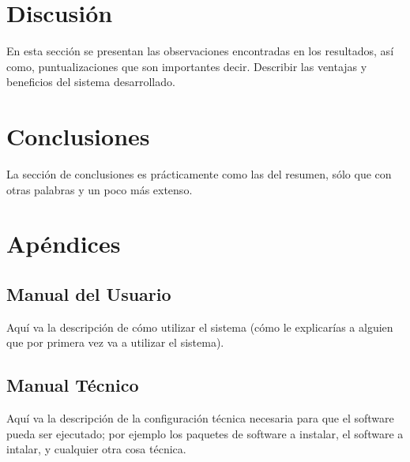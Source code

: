 \documentclass[letterpaper, 11pt]{article}
\begin{document}
%
\section{Discusión}
\label{disc}
En esta sección se presentan las observaciones encontradas en los resultados, así como, puntualizaciones que son importantes decir. Describir las ventajas y beneficios del sistema desarrollado.



%
\section{Conclusiones}
\label{conc}

La sección de conclusiones es prácticamente como las del resumen, sólo que con otras palabras y un poco más extenso. 


%
\section*{Apéndices}
\subsection{Manual del Usuario}

Aquí va la descripción de cómo utilizar el sistema (cómo le explicarías a alguien que por primera vez va a utilizar el sistema).

\subsection{Manual Técnico}

Aquí va la descripción de la configuración técnica necesaria para que el software pueda ser ejecutado; por ejemplo los paquetes de software a instalar, el software a intalar, y cualquier otra cosa técnica.


%
%



\end{document}
